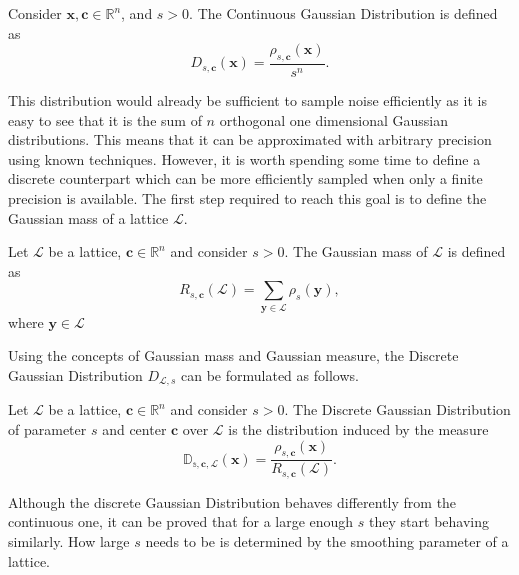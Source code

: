 \begin{definition}
Consider $\mathbf{x},\mathbf{c}\in\mathbb{R}^n$, and $s>0$. The Continuous Gaussian Distribution is defined as
\begin{equation*}
D_{s,\mathbf{c}}(\mathbf{x})=\frac{\rho_{s,\mathbf{c}}(\mathbf{x})}{s^n}.
\end{equation*}
\end{definition}

This distribution would already be sufficient to sample noise efficiently as it is easy to see that it is the sum of $n$ orthogonal one dimensional Gaussian distributions. This means that it can be approximated with arbitrary precision using known techniques. However, it is worth spending some time to define a discrete counterpart which can be more efficiently sampled when only a finite precision is available. The first step required to reach this goal is to define the Gaussian mass of a lattice $\mathscr{L}$.

\begin{definition}
Let $\mathscr{L}$ be a lattice, $\mathbf{c}\in\mathbb{R}^n$ and consider $s>0$. The Gaussian mass of $\mathscr{L}$ is defined as
\begin{equation*}
R_{s,\mathbf{c}}(\mathscr{L})=\sum_{\mathbf{y}\in\mathscr{L}}\rho_s(\mathbf{y}),
\end{equation*}
where $\mathbf{y}\in\mathscr{L}$
\end{definition}

Using the concepts of Gaussian mass and Gaussian measure, the Discrete Gaussian Distribution $D_{\mathscr{L},s}$ can be formulated as follows.

\begin{definition}
Let $\mathscr{L}$ be a lattice, $\mathbf{c}\in\mathbb{R}^n$ and consider $s>0$. The Discrete Gaussian Distribution of parameter $s$ and center $\mathbf{c}$ over $\mathscr{L}$ is the distribution induced by the measure
\begin{equation*}
\mathbb{D_{s,\mathbf{c},\mathscr{L}}}(\mathbf{x})= \frac{\rho_{s,\mathbf{c}}(\mathbf{x})}{R_{s,\mathbf{c}}(\mathscr{L})}.
\end{equation*}
\end{definition}

\begin{remark}
Although the discrete Gaussian Distribution behaves differently from the continuous one, it can be proved that for a large enough $s$ they start behaving similarly. How large $s$ needs to be is determined by the smoothing parameter of a lattice.
\end{remark}

